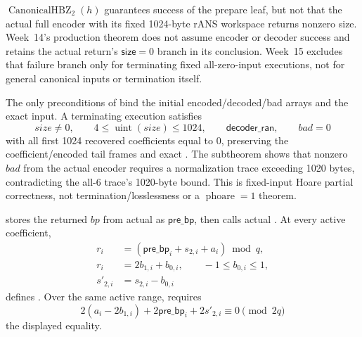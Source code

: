 \begin{boundary}
\label{bdry:hbz-success}
\(\operatorname{CanonicalHBZ}_2(h)\) guarantees success of the prepare leaf,
but not that the actual full encoder with its fixed 1024-byte rANS workspace
returns nonzero size. Week~14's production theorem does not assume encoder or
decoder success and retains the actual return's \(\mathsf{size}=0\) branch in
its conclusion. Week~15 excludes that failure branch only for terminating
fixed all-zero-input executions, not for general canonical inputs or termination itself.
\end{boundary}

\begin{verified}
\label{thm:fixed-zero-hbz-success}
The only preconditions of
 bind the initial
encoded/decoded/bad arrays and the exact  input. A
terminating execution satisfies
\[
  size\ne0,\qquad 4\le\operatorname{uint}(size)\le1024,\qquad
  \mathsf{decoder\_ran},\qquad bad=0
\]
with all first 1024 recovered coefficients equal to 0, preserving the
coefficient/encoded tail frames and exact
. The subtheorem
 shows that nonzero \(bad\) from
the actual encoder requires a normalization trace exceeding 1020 bytes,
contradicting the all-6 trace's 1020-byte bound. This is fixed-input Hoare
partial correctness, not termination/losslessness or a \(\operatorname{phoare}=1\) theorem.
\end{verified}

\begin{definition}
\label{def:keygen-matrix-finalizer-snapshot}
\leavevmode\par
{} stores the returned \(bp\)
from actual  as \(\mathsf{pre\_bp}\), then calls
actual . At every active coefficient,
\[
\begin{aligned}
  r_i&=(\mathsf{pre\_bp}_i+s_{2,i}+a_i)\bmod q,\\
  r_i&=2b_{1,i}+b_{0,i},\qquad -1\le b_{0,i}\le1,\\
  s'_{2,i}&=s_{2,i}-b_{0,i}
\end{aligned}
\]
defines .
Over the same active range,  requires
\[
  2(a_i-2b_{1,i})+
  2\mathsf{pre\_bp}_i+2s'_{2,i}\equiv0\pmod{2q}
\]
the displayed equality.
\end{definition}


